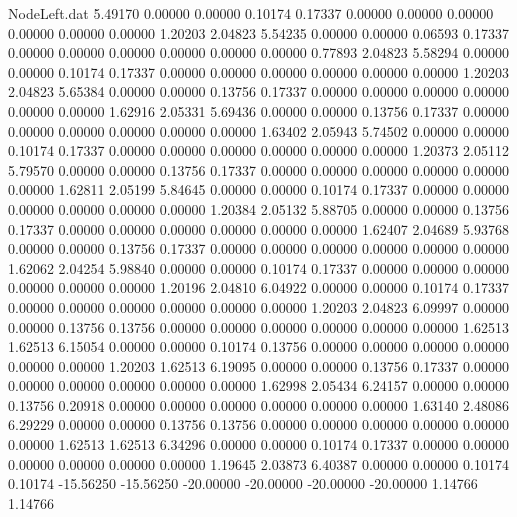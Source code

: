 \begin{filecontents}{NodeLeft.dat}
   5.49170    0.00000    0.00000     0.10174    0.17337    0.00000    0.00000    0.00000    0.00000    0.00000    0.00000    1.20203    2.04823
   5.54235    0.00000    0.00000     0.06593    0.17337    0.00000    0.00000    0.00000    0.00000    0.00000    0.00000    0.77893    2.04823
   5.58294    0.00000    0.00000     0.10174    0.17337    0.00000    0.00000    0.00000    0.00000    0.00000    0.00000    1.20203    2.04823
   5.65384    0.00000    0.00000     0.13756    0.17337    0.00000    0.00000    0.00000    0.00000    0.00000    0.00000    1.62916    2.05331
   5.69436    0.00000    0.00000     0.13756    0.17337    0.00000    0.00000    0.00000    0.00000    0.00000    0.00000    1.63402    2.05943
   5.74502    0.00000    0.00000     0.10174    0.17337    0.00000    0.00000    0.00000    0.00000    0.00000    0.00000    1.20373    2.05112
   5.79570    0.00000    0.00000     0.13756    0.17337    0.00000    0.00000    0.00000    0.00000    0.00000    0.00000    1.62811    2.05199
   5.84645    0.00000    0.00000     0.10174    0.17337    0.00000    0.00000    0.00000    0.00000    0.00000    0.00000    1.20384    2.05132
   5.88705    0.00000    0.00000     0.13756    0.17337    0.00000    0.00000    0.00000    0.00000    0.00000    0.00000    1.62407    2.04689
   5.93768    0.00000    0.00000     0.13756    0.17337    0.00000    0.00000    0.00000    0.00000    0.00000    0.00000    1.62062    2.04254
   5.98840    0.00000    0.00000     0.10174    0.17337    0.00000    0.00000    0.00000    0.00000    0.00000    0.00000    1.20196    2.04810
   6.04922    0.00000    0.00000     0.10174    0.17337    0.00000    0.00000    0.00000    0.00000    0.00000    0.00000    1.20203    2.04823
   6.09997    0.00000    0.00000     0.13756    0.13756    0.00000    0.00000    0.00000    0.00000    0.00000    0.00000    1.62513    1.62513
   6.15054    0.00000    0.00000     0.10174    0.13756    0.00000    0.00000    0.00000    0.00000    0.00000    0.00000    1.20203    1.62513
   6.19095    0.00000    0.00000     0.13756    0.17337    0.00000    0.00000    0.00000    0.00000    0.00000    0.00000    1.62998    2.05434
   6.24157    0.00000    0.00000     0.13756    0.20918    0.00000    0.00000    0.00000    0.00000    0.00000    0.00000    1.63140    2.48086
   6.29229    0.00000    0.00000     0.13756    0.13756    0.00000    0.00000    0.00000    0.00000    0.00000    0.00000    1.62513    1.62513
   6.34296    0.00000    0.00000     0.10174    0.17337    0.00000    0.00000    0.00000    0.00000    0.00000    0.00000    1.19645    2.03873
   6.40387    0.00000    0.00000     0.10174    0.10174  -15.56250  -15.56250  -20.00000  -20.00000  -20.00000  -20.00000    1.14766    1.14766

\end{filecontents}

